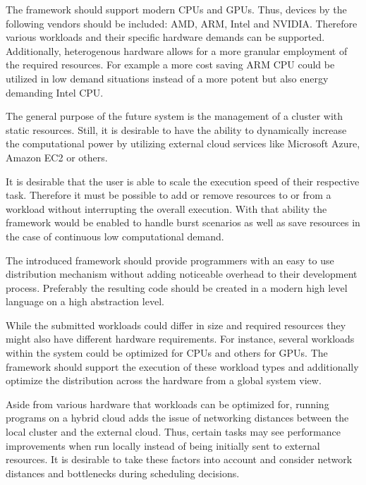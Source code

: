 \begin{description}[style=nextline]
    \item [Heterogeneity]
    The framework should support modern CPUs and GPUs. Thus, devices by the following vendors should be included: AMD, ARM, Intel and NVIDIA. Therefore various workloads and their specific hardware demands can be supported. Additionally, heterogenous hardware allows for a more granular employment of the required resources. For example a more cost saving ARM CPU could be utilized in low demand situations instead of a more potent but also energy demanding Intel CPU.

    \item [Resource Scalability]
    The general purpose of the future system is the management of a cluster with static resources. Still, it is desirable to have the ability to dynamically increase the computational power by utilizing external cloud services like Microsoft Azure, Amazon EC2 or others.

    \item [Scalable Speed]
    It is desirable that the user is able to scale the execution speed of their respective task. Therefore it must be possible to add or remove resources to or from a workload without interrupting the overall execution. With that ability the framework would be enabled to handle burst scenarios as well as save resources in the case of continuous low computational demand.

    \item [Ease of Programming]
    The introduced framework should provide programmers with an easy to use distribution mechanism without adding noticeable overhead to their development process. Preferably the resulting code should be created in a modern high level language on a high abstraction level.

    \item [Workload Diversity]
    While the submitted workloads could differ in size and required resources they might also have different hardware requirements. For instance, several workloads within the system could be optimized for CPUs and others for GPUs. The framework should support the execution of these workload types and additionally optimize the distribution across the hardware from a global system view.

    \item [Location Optimized Scheduling]
    Aside from various hardware that workloads can be optimized for, running programs on a hybrid cloud adds the issue of networking distances between the local cluster and the external cloud. Thus, certain tasks may see performance improvements when run locally instead of being initially sent to external resources. It is desirable to take these factors into account and consider network distances and bottlenecks during scheduling decisions.

\end{description}
